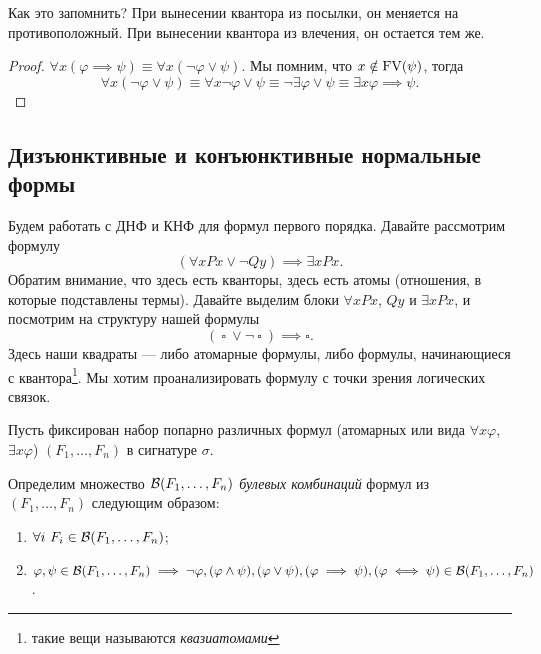 Как это запомнить?
При вынесении квантора из посылки, он меняется на противоположный.
При вынесении квантора из влечения, он остается тем же.

\begin{proof}
    $\forall x (\varphi \implies \psi) \equiv \forall x (\neg \varphi \lor \psi)$.
    Мы помним, что $x \notin \mathrm{FV}(\psi)$, тогда
    $$
        \forall x (\neg \varphi \lor \psi) \equiv \forall x \neg \varphi \lor \psi \equiv \neg \exists \varphi \lor \psi \equiv \exists x \varphi \implies \psi.
    $$
\end{proof}

\subsection{Дизъюнктивные и конъюнктивные нормальные формы}

Будем работать с ДНФ и КНФ для формул первого порядка.
Давайте рассмотрим формулу
$$
    (\forall x Px \lor \neg Qy) \implies \exists x Px.
$$
Обратим внимание, что здесь есть кванторы, здесь есть атомы (отношения, в которые подставлены термы).
Давайте выделим блоки $\forall x Px$, $Qy$ и $\exists x P x$, и посмотрим на структуру нашей формулы
$$
    (~\square~ \lor \neg~\square~) \implies \square.
$$
Здесь наши квадраты --- либо атомарные формулы, либо формулы, начинающиеся с квантора\footnote{такие вещи называются {\it квазиатомами}}.
Мы хотим проанализировать формулу с точки зрения логических связок.

Пусть фиксирован набор попарно различных формул (атомарных или вида $\forall x \varphi$, $\exists x \varphi$) $(F_{1}, \ldots, F_{n})$ в сигнатуре $\sigma$.
\begin{definition}
    Определим множество $\mathcal{B}(F_{1}, \ldots, F_{n})$ {\it булевых комбинаций} формул из $(F_{1}, \ldots, F_{n})$ следующим образом:
    \begin{enumerate}
        \item $\forall i~F_{i} \in \mathcal{B}(F_{1}, \ldots, F_{n})$;
        \item $\varphi, \psi \in \mathcal{B}(F_{1}, \ldots, F_{n}) \implies \neg \varphi, (\varphi \land \psi), (\varphi \lor \psi), (\varphi \implies \psi), (\varphi \iff \psi) \in \mathcal{B}(F_{1}, \ldots, F_{n})$.
    \end{enumerate}
\end{definition}

